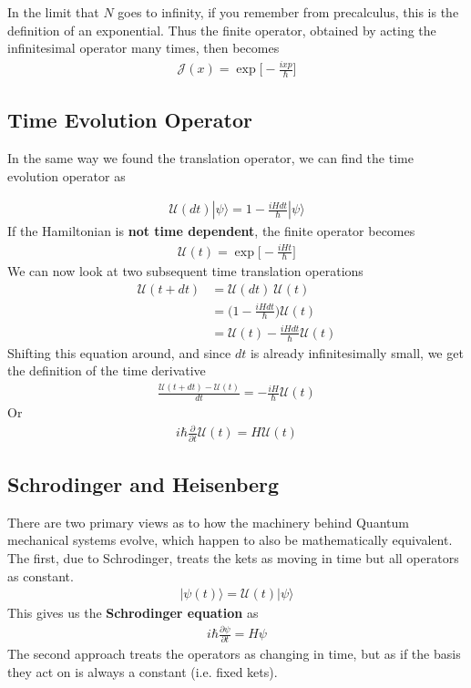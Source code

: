 In the limit that $N$ goes to infinity, if you remember from precalculus, this is the definition of an exponential. Thus the finite operator, obtained by acting the infinitesimal operator many times, then becomes
\begin{align}
\mathcal{J}(x) = \exp\Big[ -\frac{i x p}{\hbar}\Big]
\end{align}


\subsection{Time Evolution Operator}\label{timeevolve}
In the same way we found the translation operator, we can find the time evolution operator as

\begin{align}
\mathcal{U}(dt)|\psi\rangle = 1 - \frac{iHdt}{\hbar}|\psi\rangle 
\end{align}
If the Hamiltonian is \textbf{not time dependent}, the finite operator becomes
\begin{align}
\mathcal{U}(t) = \exp\Big[-\frac{iHt}{\hbar}\Big]
\end{align}
We can now look at two subsequent time translation operations
\begin{align}
    \mathcal{U}(t + dt) &= \mathcal{U}(dt)~\mathcal{U}(t) \\
    &= \Big(1 - \frac{iHdt}{\hbar}\Big)\mathcal{U}(t)\\
    &= \mathcal{U}(t) - \frac{iHdt}{\hbar}\mathcal{U}(t)
\end{align}
Shifting this equation around, and since $dt$ is already infinitesimally small, we get the definition of the time derivative
\begin{align}
    \frac{\mathcal{U}(t + dt) - \mathcal{U}(t)}{dt} = -\frac{iH}{\hbar}\mathcal{U}(t)
\end{align}
Or
\begin{align}\label{operatorevo}
    i\hbar\frac{\partial}{\partial t}\mathcal{U}(t) = H\mathcal{U}(t)
\end{align}



\subsection{Schrodinger and Heisenberg}
There are two primary views as to how the machinery behind Quantum mechanical systems evolve, which happen to also be mathematically equivalent. The first, due to Schrodinger, treats the kets as moving in time but all operators as constant. 
\begin{align}
    |\psi(t)\rangle = \mathcal{U}(t)|\psi\rangle
\end{align}
This gives us the \textbf{Schrodinger equation} as
\begin{align}
i\hbar\frac{\partial\psi }{\partial t} = H\psi
\end{align}
The second approach treats the operators as changing in time, but as if the basis they act on is always a constant (i.e. fixed kets). 


